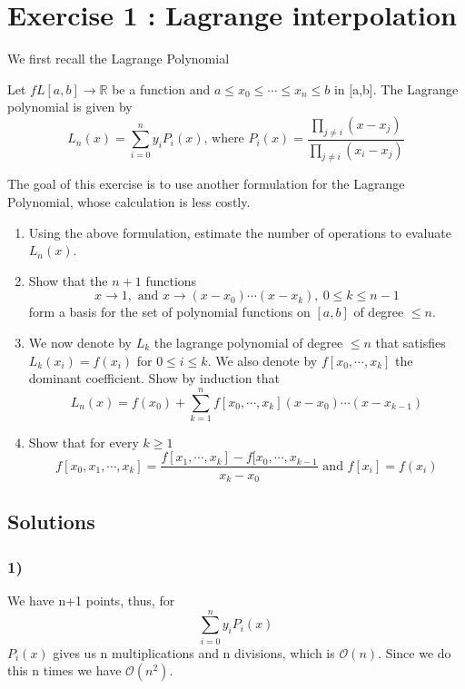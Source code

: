 \section{Exercise 1 : Lagrange interpolation}
\label{sec:Exercise 1 : Lagrange interpolation}
We first recall the Lagrange Polynomial         
\begin{defn}
    Let $ f L [a,b] \to \mathbb{R} $ be a function and $ a\leq x_0 \leq \cdots \leq x_n
    \leq b $ in [a,b]. The Lagrange polynomial is given by 
    \[
        L_n(x) = \sum_{i=0}^{n} y_iP_i(x)\text{, where } P_i(x) = \frac{
        \prod_{j\neq i}\left( x-x_j\right)  }{ \prod_{j\neq i} \left( x_i - x_j\right)  } 
    \]
    \label{def:Lagrange Polynomial}
\end{defn}

The goal of this exercise is to use another formulation for the Lagrange Polynomial, whose
calculation is less costly. 
\begin{enumerate}[]
    \item Using the above formulation, estimate the number of operations to evaluate
        $ L_n(x) $. 
    \item Show that the $ n+1 $ functions 
        \[
        x\to1, \text{ and } x\to\left( x-x_0\right) \cdots\left( x-x_k\right) , \ 0\leq k
        \leq n-1 
    \] form a basis for the set of polynomial functions on $ [a,b] $ of degree $ \leq  n$. 
\item We now denote by $ L_k  $ the lagrange polynomial of degree $ \leq n $ that
    satisfies $ L_k(x_i) = f(x_i) $ for $ 0\leq i \leq k $. We also denote by $ f[x_0,
    \cdots, x_k ] $ the dominant coefficient. Show by induction that 
    \[
        L_n(x) = f(x_0) + \sum_{k=1}^{n} f[x_0, \cdots, x_k] \left( x-x_0\right) \cdots 
        \left( x-x_{k-1}\right) 
    \]
\item Show that for every $ k\geq 1 $
    \[
        f[x_0, x_1, \cdots, x_k] = \frac{ f[x_1, \cdots, x_k] - f[x_0, \cdots, x_{k-1}  }{
        x_k - x_0 } \text{ and } f[x_i] = f(x_i)
    \] 
\end{enumerate} 
\subsection{Solutions }
\subsubsection{1)}
We have n+1 points, thus, for 
\[
    \sum_{i=0}^{n} y_i P_i(x) 
\]
$ P_i(x)  $ gives us n multiplications and n divisions, which is $ \mathcal{ O  } (n)  $.
Since we do this n times we have $ \mathcal{ O  }(n^2)$. 

